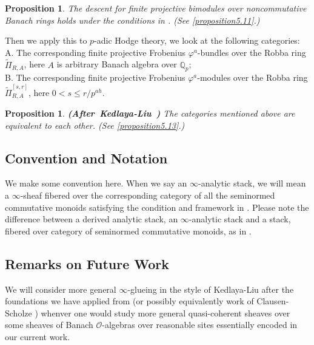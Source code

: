 \documentclass[12pt]{amsart}
\newtheorem{proposition}[theorem]{Proposition}
\theoremstyle{definition}
\numberwithin{equation}{section}
\begin{document}
\begin{proposition} 
The descent for finite projective bimodules over noncommutative Banach rings holds under the conditions in \cite[Definition 2.7.3 (a),(b)]{KL1}.	(See \cref{proposition5.11}.)\\
\end{proposition}

\indent Then we apply this to $p$-adic Hodge theory, we look at the following categories:\\
\noindent A. The corresponding finite projective Frobenius $\varphi^a$-bundles over the Robba ring $\widetilde{\Pi}_{R,A}$, here $A$ is arbitrary Banach algebra over $\mathbb{Q}_p$;\\
\noindent B. The corresponding finite projective Frobenius $\varphi^a$-modules over the Robba ring $\widetilde{\Pi}^{[s,r]}_{R,A}$, here $0<s\leq r/p^{ah}$.

\begin{proposition}\mbox{\bf{(After Kedlaya-Liu \cite[Theorem 4.6.1]{KL2})}}
The categories mentioned above are equivalent to each other. (See \cref{proposition5.13}.)\\
\end{proposition}




\subsection{Convention and Notation}

\indent We make some convention here. When we say an $\infty$-analytic stack, we will mean a $\infty$-sheaf fibered over the corresponding category of all the seminormed commutative monoids satisfying the condition and framework in \cite{BBBK}. Please note the difference between a derived analytic stack, an $\infty$-analytic stack and a stack, fibered over category of seminormed commutative monoids, as in \cite{BBBK}.\\



\subsection{Remarks on Future Work}

\indent We will consider more general $\infty$-glueing in the style of Kedlaya-Liu \cite{KL2} after the foundations we have applied from \cite{BK} (or possibly equivalently work of Clausen-Scholze \cite{CS}) whenver one would study more general quasi-coherent sheaves over some sheaves of Banach $\mathcal{O}$-algebras over reasonable sites essentially encoded in our current work.\\
\end{document}
